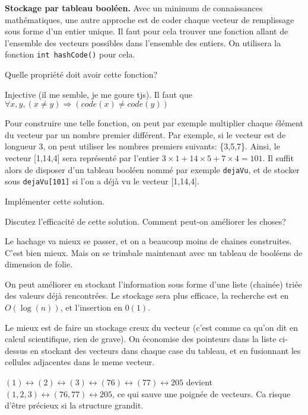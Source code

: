 \documentclass[10pt]{article}\usepackage[correction,nu]{esial}%
\begin{document}
\Exercice\textbf{Stockage par tableau booléen.} Avec un minimum de connaissances
mathématiques, une autre approche est de coder chaque vecteur de remplissage
sous forme d'un entier unique. Il faut pour cela trouver une fonction allant de
l'ensemble des vecteurs possibles dans l'ensemble des entiers. On utilisera la
fonction \texttt{int hashCode()} pour cela.

\Question Quelle propriété doit avoir cette fonction?
\begin{Reponse}
  Injective (il me semble, je me goure tjs). Il faut que $\forall x,y, (x\neq y)
  \Rightarrow (code(x)\neq code(y))$
\end{Reponse}

Pour construire une telle fonction, on peut par exemple multiplier chaque
élément du vecteur par un nombre premier différent.  Par exemple, si le vecteur
est de longueur 3, on peut utiliser les nombres premiers suivants:
\{3,5,7\}. Ainsi, le vecteur [1,14,4] sera représenté par l'entier $3\times
1+14\times 5+7\times 4=101$. Il suffit alors de disposer d'un tableau booléen
nommé par exemple \texttt{dejaVu}, et de stocker sous \texttt{dejaVu[101]} si
l'on a déjà vu le vecteur [1,14,4].

\Question Implémenter cette solution.

\Question Discutez l'efficacité de cette solution. Comment peut-on améliorer
les choses?
\begin{Reponse}
  Le hachage va mieux se passer, et on a beaucoup moins de chaines
  construites. C'est bien mieux. Mais on se trimbale maintenant avec un tableau
  de booléens de dimension de folie.

  On peut améliorer en stockant l'information sous forme d'une liste (chainée)
  triée des valeurs déjà rencontrées. Le stockage sera plus efficace, la
  recherche est en $O(\log(n))$, et l'insertion en $0(1)$.

  Le mieux est de faire un stockage creux du vecteur (c'est comme ca qu'on dit
  en calcul scientifique, rien de grave). On économise des pointeurs dans la
  liste ci-dessus en stockant des vecteurs dans chaque case du tableau, et en
  fusionnant les cellules adjacentes dans le meme vecteur.

  $(1) \leftrightarrow (2) \leftrightarrow (3) \leftrightarrow (76)
  \leftrightarrow (77) \leftrightarrow 205$ devient $(1,2,3) \leftrightarrow
  (76,77) \leftrightarrow 205$, ce qui sauve une poignée de vecteurs. Ca risque
  d'être précieux si la structure grandit.
\end{Reponse}
\end{document}
